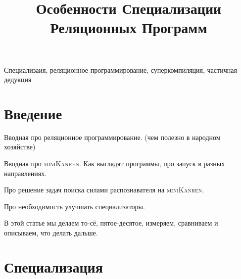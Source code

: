 \documentclass[conference]{IEEEtran}
\begin{document}
\newcommand{\miniKanren}{\textsc{miniKanren}}


\title{Особенности Специализации Реляционных Программ}

\author{
\and
{}

}

\maketitle

\begin{abstract}
    
\end{abstract}

\begin{IEEEkeywords}
Специализаия, реляционное программирование, суперкомпиляция, частичная дедукция 
\end{IEEEkeywords}

\section{Введение}

Вводная про реляционное программирование. (чем полезно в народном хозяйстве)

Вводная про \miniKanren. Как выглядят программы, про запуск в разных направлениях.

Про решение задач поиска силами распознавателя на \miniKanren.~\cite{lozov2019relational}

Про необходимость улучшать специализаторы. 

В этой статье мы делаем то-сё, пятое-десятое, измеряем, сравниваем и описываем, что делать дальше. 



\section{Специализация}
\end{document}
